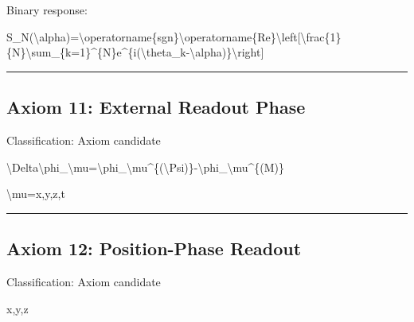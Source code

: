 \documentclass[
  a4paper,
]{article}
\newenvironment{Shaded}{}{}
\newcommand{\NormalTok}[1]{#1}
\begin{document}
Binary response:

\begin{Shaded}
\begin{Highlighting}[]
\NormalTok{S\_N(\textbackslash{}alpha)=\textbackslash{}operatorname\{sgn\}\textbackslash{}operatorname\{Re\}\textbackslash{}left[\textbackslash{}frac\{1\}\{N\}\textbackslash{}sum\_\{k=1\}\^{}\{N\}e\^{}\{i(\textbackslash{}theta\_k{-}\textbackslash{}alpha)\}\textbackslash{}right]}
\end{Highlighting}
\end{Shaded}

\begin{center}\rule{0.5\linewidth}{0.5pt}\end{center}

\subsection{Axiom 11: External Readout
Phase}\label{axiom-11-external-readout-phase}

Classification: Axiom candidate

\begin{Shaded}
\begin{Highlighting}[]
\NormalTok{\textbackslash{}Delta\textbackslash{}phi\_\textbackslash{}mu=\textbackslash{}phi\_\textbackslash{}mu\^{}\{(\textbackslash{}Psi)\}{-}\textbackslash{}phi\_\textbackslash{}mu\^{}\{(M)\}}
\end{Highlighting}
\end{Shaded}

\begin{Shaded}
\begin{Highlighting}[]
\NormalTok{\textbackslash{}mu=x,y,z,t}
\end{Highlighting}
\end{Shaded}

\begin{center}\rule{0.5\linewidth}{0.5pt}\end{center}

\subsection{Axiom 12: Position-Phase
Readout}\label{axiom-12-position-phase-readout}

Classification: Axiom candidate

\begin{Shaded}
\begin{Highlighting}[]
\NormalTok{x,y,z}
\end{Highlighting}
\end{Shaded}
\end{document}

